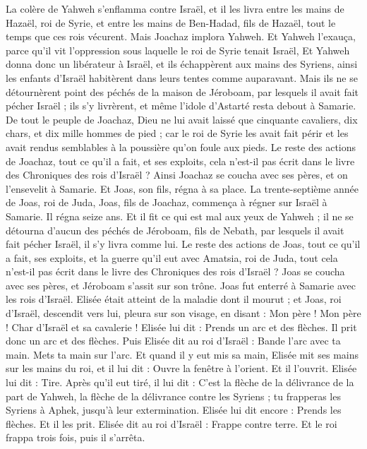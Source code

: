 \begin{multicols}{2}
La colère de Yahweh s’enflamma contre Israël, et il les livra entre les mains de Hazaël, roi de Syrie, et entre les mains de Ben-Hadad, fils de Hazaël, tout le temps que ces rois vécurent.
Mais Joachaz implora Yahweh. Et Yahweh l’exauça, parce qu’il vit l’oppression sous laquelle le roi de Syrie tenait Israël,
Et Yahweh donna donc un libérateur à Israël, et ils échappèrent aux mains des Syriens, ainsi les enfants d’Israël habitèrent dans leurs tentes comme auparavant.
Mais ils ne se détournèrent point des péchés de la maison de Jéroboam, par lesquels il avait fait pécher Israël ; ils s’y livrèrent, et même l’idole d’Astarté\FTNT{} resta debout à Samarie.
De tout le peuple de Joachaz, Dieu ne lui avait laissé que cinquante cavaliers, dix chars, et dix mille hommes de pied ; car le roi de Syrie les avait fait périr et les avait rendus semblables à la poussière qu’on foule aux pieds.
Le reste des actions de Joachaz, tout ce qu’il a fait, et ses exploits, cela n’est-il pas écrit dans le livre des Chroniques des rois d’Israël ?
Ainsi Joachaz se coucha avec ses pères, et on l’ensevelit à Samarie. Et Joas, son fils, régna à sa place.
La trente-septième année de Joas, roi de Juda, Joas, fils de Joachaz, commença à régner sur Israël à Samarie. Il régna seize ans.
Et il fit ce qui est mal aux yeux de Yahweh ; il ne se détourna d’aucun des péchés de Jéroboam, fils de Nebath, par lesquels il avait fait pécher Israël, il s’y livra comme lui.
Le reste des actions de Joas, tout ce qu’il a fait, ses exploits, et la guerre qu’il eut avec Amatsia, roi de Juda, tout cela n’est-il pas écrit dans le livre des Chroniques des rois d’Israël ?
Joas se coucha avec ses pères, et Jéroboam s’assit sur son trône. Joas fut enterré à Samarie avec les rois d’Israël.
Elisée était atteint de la maladie dont il mourut ; et Joas, roi d’Israël, descendit vers lui, pleura sur son visage, en disant : Mon père ! Mon père ! Char d’Israël et sa cavalerie !
Elisée lui dit : Prends un arc et des flèches. Il prit donc un arc et des flèches.
Puis Elisée dit au roi d’Israël : Bande l’arc avec ta main. Mets ta main sur l’arc. Et quand il y eut mis sa main, Elisée mit ses mains sur les mains du roi,
et il lui dit : Ouvre la fenêtre à l’orient. Et il l’ouvrit. Elisée lui dit : Tire. Après qu’il eut tiré, il lui dit : C’est la flèche de la délivrance de la part de Yahweh, la flèche de la délivrance contre les Syriens ; tu frapperas les Syriens à Aphek, jusqu’à leur extermination.
Elisée lui dit encore : Prends les flèches. Et il les prit. Elisée dit au roi d’Israël : Frappe contre terre. Et le roi frappa trois fois, puis il s’arrêta.

\end{multicols}
